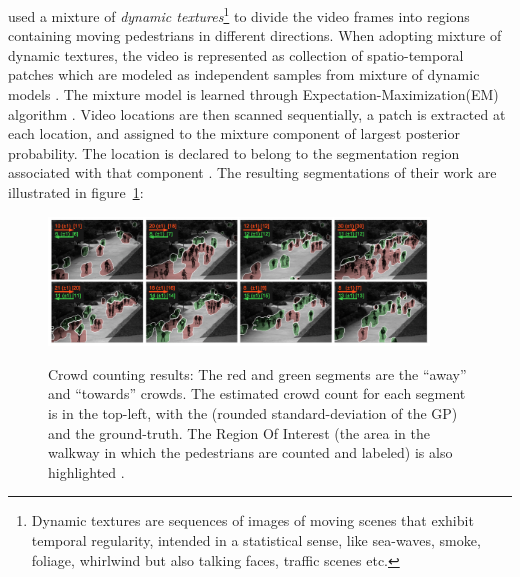\citeauthor*{chan2008privacy} used a mixture of \textit{dynamic textures}\footnote{Dynamic textures are sequences of images of moving scenes that exhibit temporal regularity, intended in a statistical sense, like sea-waves, smoke, foliage, whirlwind but also talking faces, traffic scenes etc.} \cite{doretto2003dynamic, chan2008modeling} to divide the video frames into regions containing moving pedestrians in different directions. When adopting mixture of dynamic textures, the video is represented as collection of spatio-temporal patches which are modeled as independent samples from mixture of dynamic models \cite{doretto2003dynamic}. The mixture model is learned through Expectation-Maximization(EM) algorithm \cite{chan2008modeling}. Video locations are then scanned sequentially, a patch is extracted at each location, and assigned to the mixture component of largest posterior probability. The location is declared to belong to the segmentation region associated with that component  \cite{chan2008privacy}. The resulting segmentations of their work are illustrated in figure~\ref{fig:segUcsd}:
\begin{figure}[H]
	\centering
	{\includegraphics[width=0.9\textwidth]{images/segUcsd}}
	\caption{Crowd counting results: The red and green segments are the “away” and “towards” crowds. The estimated crowd count for each segment is in the top-left, with the (rounded standard-deviation of the GP) and the ground-truth. The Region Of Interest (the area in the walkway in which the pedestrians are counted and labeled) is also highlighted \cite{chan2008privacy}.}
	\label{fig:segUcsd}
\end{figure}

